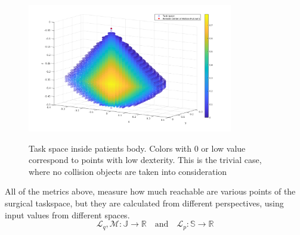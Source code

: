 \begin{center}
\begin{figure}[!htb]
\centering
\includegraphics[width=0.8\textwidth]{images/rcm_taskspace.png}\\
\caption{Task space inside patients body. Colors with 0 or low value correspond to points with low dexterity. This is the trivial case, where no collision objects are taken into consideration}
\label{surgical-taskspace}
\end{figure}
\end{center}

All of the metrics above, measure how much reachable are various points of the surgical taskspace, but they are calculated from different perspectives, using input values from different spaces.
\begin{equation}
\mathcal{L}_{q}, \mathcal{M}: \mathbb{J} \longrightarrow \mathbb{R} \quad \textrm{and} \quad
\mathcal{L}_{p}: \mathbb{S} \longrightarrow \mathbb{R}
\end{equation}